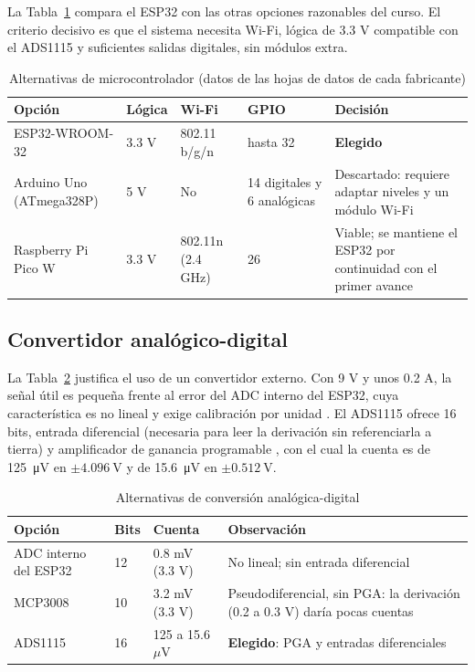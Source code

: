 \documentclass[10pt,letterpaper,twocolumn]{article}
\begin{document}
La Tabla~\ref{tab:mcu} compara el ESP32 con las otras opciones razonables del curso. El criterio decisivo es que el sistema necesita Wi-Fi, lógica de 3.3 V compatible con el ADS1115 y suficientes salidas digitales, sin módulos extra.

\begin{table}[t]
\centering
\caption{Alternativas de microcontrolador (datos de las hojas de datos de cada fabricante)}
\label{tab:mcu}
\footnotesize
\begin{tabular}{@{}p{1.8cm}p{0.8cm}p{1.4cm}p{1.3cm}p{2.1cm}@{}}
\toprule
Opción & Lógica & Wi-Fi & GPIO & Decisión\\
\midrule
ESP32-WROOM-32 \cite{esp32} & 3.3 V & 802.11 b/g/n & hasta 32 & \textbf{Elegido}\\
Arduino Uno (ATmega328P) \cite{uno} & 5 V & No & 14 digitales y 6 analógicas & Descartado: requiere adaptar niveles y un módulo Wi-Fi\\
Raspberry Pi Pico W \cite{pico} & 3.3 V & 802.11n (2.4 GHz) & 26 & Viable; se mantiene el ESP32 por continuidad con el primer avance\\
\bottomrule
\end{tabular}
\end{table}


\subsection{Convertidor analógico-digital}
La Tabla~\ref{tab:adc} justifica el uso de un convertidor externo. Con 9 V y unos 0.2 A, la señal útil es pequeña frente al error del ADC interno del ESP32, cuya característica es no lineal y exige calibración por unidad \cite{esp32}. El ADS1115 ofrece 16 bits, entrada diferencial (necesaria para leer la derivación sin referenciarla a tierra) y amplificador de ganancia programable \cite{ads1115}, con el cual la cuenta es de \SI{125}{\micro\volt} en $\pm\SI{4.096}{\volt}$ y de \SI{15.6}{\micro\volt} en $\pm\SI{0.512}{\volt}$.

\begin{table}[t]
\centering
\caption{Alternativas de conversión analógica-digital}
\label{tab:adc}
\footnotesize
\begin{tabular}{@{}p{2.1cm}p{0.9cm}p{1.9cm}p{2.3cm}@{}}
\toprule
Opción & Bits & Cuenta & Observación\\
\midrule
ADC interno del ESP32 & 12 & 0.8 mV (3.3 V) & No lineal; sin entrada diferencial\\
MCP3008 \cite{mcp3008} & 10 & 3.2 mV (3.3 V) & Pseudodiferencial, sin PGA: la derivación (0.2 a 0.3 V) daría pocas cuentas\\
ADS1115 \cite{ads1115} & 16 & 125 a 15.6 $\mu$V & \textbf{Elegido}: PGA y entradas diferenciales\\
\bottomrule
\end{tabular}
\end{table}
\end{document}
